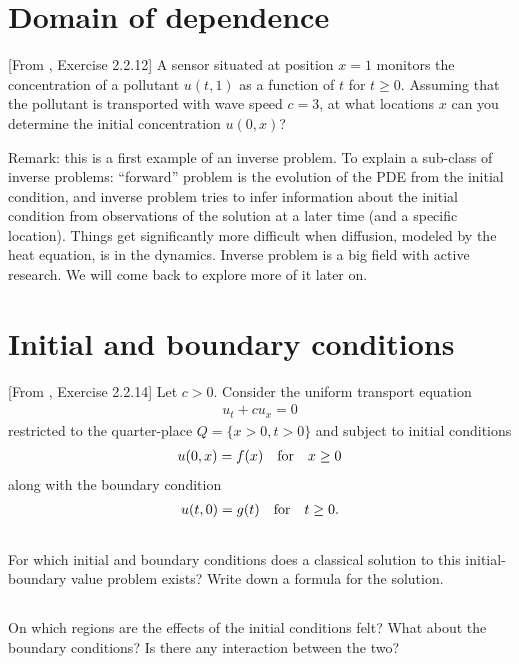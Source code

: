 \documentclass[11pt,letterpaper]{article}
\begin{document}
\section{Domain of dependence}
[From \cite{Olver_14}, Exercise 2.2.12] A sensor situated at position $x=1$ monitors the concentration of a pollutant $u(t,1)$ as a function of $t$ for $t\geq 0$. Assuming that the pollutant is transported with wave speed $c=3$, at what locations $x$ can you determine the initial concentration $u(0,x)$? 

Remark: this is a first example of an inverse problem. To explain a sub-class of inverse problems: ``forward'' problem is the evolution of the PDE from the initial condition, and inverse problem tries to infer information about the initial condition from observations of the solution at a later time (and a specific location). Things get significantly more difficult when diffusion, modeled by the heat equation, is in the dynamics. Inverse problem is a big field with active research. We will come back to explore more of it later on.

\section{Initial and boundary conditions}
[From \cite{Olver_14}, Exercise 2.2.14] Let $c>0$. Consider the uniform transport equation
\begin{align}
    u_t+cu_x = 0
\end{align}
restricted to the quarter-place $Q = \{x>0, t>0\}$ and subject to initial conditions
\begin{align}
    u(0,x) = f(x) \quad \mbox{for} \quad x\geq 0
\end{align}
along with the boundary condition
\begin{align}
    u(t,0) = g(t) \quad \mbox{for} \quad t\geq 0.
\end{align}

\subsection{}
For which initial and boundary conditions does a classical solution to this initial-boundary value problem exists? Write down a formula for the solution.

\subsection{}
On which regions are the effects of the initial conditions felt? What about the boundary conditions? Is there any interaction between the two?
\end{document}
